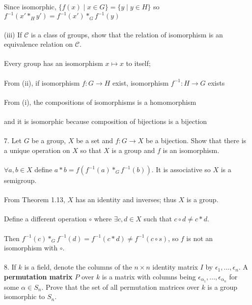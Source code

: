 \documentclass{article}
\begin{document}
\begin{siderules}
\null\qquad Since isomorphic, \(\{f(x)\;|\;x\in G\}=\{y\;|\;y\in H\}\) so \(f^{-1}(x'*_{H}y')=f^{-1}(x')*_{G}f^{-1}(y)\)\\\\
\color{blue} (iii) If \(\mathscr{C}\) is a class of groups, show that the relation of isomorphism is an equivalence relation on \(\mathscr{C}\).\\\\\color{black}
\null\qquad Every group has an isomorphism \(x\mapsto x\) to itself;\\\\
\null\qquad From \color{gray}(ii)\color{black}, if isomorphism \(f:G\to H\) exist, isomorphism \(f^{-1}: H\to G\) exists\\\\
\null\qquad From \color{gray}(i)\color{black}, the compositions of isomorphisms is a homomorphism\\\\
\null\qquad and it is isomorphic because composition of bijections is a bijection\\\\
\color{blue} 7. Let \(G\) be a group, \(X\) be a set and \(f:G\to X\) be a bijection. Show that there is a unique operation on \(X\) so that \(X\) is a group and \(f\) is an isomorphism.\\\\\color{black}
\null\qquad \(\forall a,b\in X\) define \(a*b=f(f^{-1}(a)*_{G}f^{-1}(b))\). It is associative so \(X\) is a semigroup.\\\\
\null\qquad From \color{gray}Theorem 1.13\color{black}, \(X\) has an identity and inverses; thus \(X\) is a group.\\\\
\null\qquad Define a different operation \(\circ\) where \(\exists c,d\in X\) such that \(c\circ d\neq c*d\).\\\\
\null\qquad Then \(f^{-1}(c)*_{G}f^{-1}(d)=f^{-1}(c*d)\neq f^{-1}(c\circ s)\), so \(f\) is not an isomorphism with \(\circ\).\\\\
\color{blue} 8. If \(k\) is a field, denote the columns of the \(n\times n\) identity matrix \(I\) by \(\epsilon_{1},...,\epsilon_{n}\). A \textbf{permutation matrix} \(P\) over \(k\)
is a matrix with columns being \(\epsilon_{\alpha_{1}},...,\epsilon_{\alpha_{n}}\) for some \(\alpha\in S_{n}\). Prove that the set 
of all permutation matrices over \(k\) is a group isomorphic to \(S_{n}\).\color{black}\\\\

\end{siderules}
\end{document}

